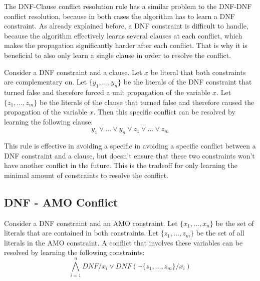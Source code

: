 The DNF-Clause conflict resolution rule has a similar problem to the DNF-DNF conflict resolution, because in both cases the algorithm has to learn a DNF constraint. As already explained before, a DNF constraint is difficult to handle, because the algorithm effectively learns several clauses at each conflict, which makes the propagation significantly harder after each conflict. That is why it is beneficial to also only learn a single clause in order to resolve the conflict.

\begin{leftbar}
Consider a DNF constraint and a clause. Let $x$ be literal that both constraints are complementary on. Let $\{y_1,...,y_n\}$ be the literals of the DNF constraint that turned false and therefore forced a unit propagation of the variable $x$. Let $\{z_1,...,z_m\}$ be the literals of the clause that turned false and therefore caused the propagation of the variable $x$. Then this specific conflict can be resolved by learning the following clause:
\begin{displaymath}
y_1 \vee ... \vee y_n \vee z_1 \vee ... \vee z_m
\end{displaymath}
\end{leftbar}

This rule is effective in avoiding a specific in avoiding a specific conflict between a DNF constraint and a clause, but doesn't ensure that these two constraints won't have another conflict in the future. This is the tradeoff for only learning the minimal amount of constraints to resolve the conflict.



\subsection{DNF - AMO Conflict}

\begin{leftbar}
Consider a DNF constraint and an AMO constraint. Let $\{x_1,...,x_n\}$ be the set of literals that are contained in both constraints. Let $\{z_1,...,z_m\}$ be the set of all literals in the AMO constraint. A conflict that involves these variables can be resolved by learning the following constraints:
\begin{displaymath}
\bigwedge_{i=1}^{n} DNF / x_i \vee DNF(\neg \{z_1,...,z_m\}/x_i)
\end{displaymath}
\end{leftbar}

